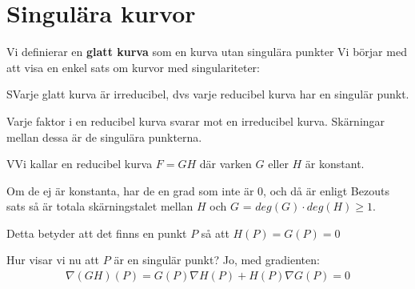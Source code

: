 \section{Singulära kurvor}\par
\noindent Vi definierar en \textbf{glatt kurva} som en kurva utan singulära punkter 
\noindent Vi börjar med att visa en enkel sats om kurvor med singulariteter:
\par\bigskip
\begin{theo}
  SVarje glatt kurva är irreducibel, dvs varje reducibel kurva har en singulär punkt.
\end{theo}
\par\bigskip
\noindent Varje faktor i en reducibel kurva svarar mot en irreducibel kurva. Skärningar mellan dessa är de singulära punkterna.
\par\bigskip
\begin{prf}
  VVi kallar en reducibel kurva $F=GH$ där varken $G$ eller $H$ är konstant.\par
  \noindent Om de ej är konstanta, har de en grad som inte är 0, och då är enligt Bezouts sats så är totala skärningstalet mellan $H$ och $G$ = $deg(G)\cdot deg(H)\geq1$.\par
  \noindent Detta betyder att det finns en punkt $P$ så att $H(P)=G(P)=0$\par
  \noindent Hur visar vi nu att $P$ är en singulär punkt? Jo, med gradienten:
  \begin{equation*}
    \begin{gathered}
      \nabla(GH)(P) = G(P)\nabla H(P)+H(P)\nabla G(P) = 0
    \end{gathered}
  \end{equation*}
\end{prf}
